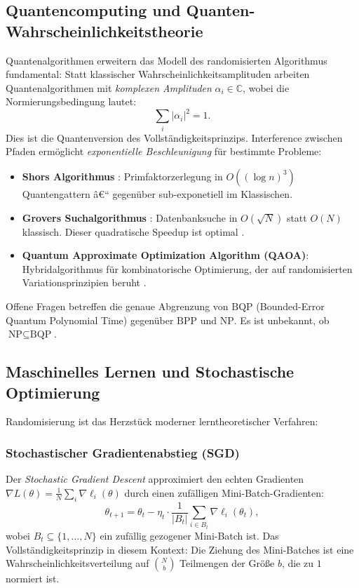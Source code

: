 ﻿\documentclass[12pt,a4paper]{article}
\theoremstyle{definition}
\theoremstyle{plain}
\theoremstyle{remark}
\begin{document}
\subsection{Quantencomputing und Quanten-Wahr\-schein\-lich\-keits\-theo\-rie}

Quantenalgorithmen erweitern das Modell des randomisierten Algorithmus
fundamental: Statt klassischer Wahrscheinlichkeitsamplituden arbeiten
Quantenalgorithmen mit \emph{komplexen Amplituden} $\alpha_i \in \mathbb{C}$,
wobei die Normierungsbedingung lautet:
\[
  \sum_i |\alpha_i|^2 = 1.
\]
Dies ist die Quantenversion des Vollständigkeitsprinzips. Interference zwischen
Pfaden ermöglicht \emph{exponentielle Beschleunigung} für bestimmte Probleme:
\begin{itemize}
  \item \textbf{Shors Algorithmus} \cite{shor1994algorithms}: Primfaktorzerlegung
    in $O((\log n)^3)$ Quantengattern â€“ gegenüber sub-exponetiell im Klassischen.
  \item \textbf{Grovers Suchalgorithmus} \cite{grover1996fast}: Datenbanksuche
    in $O(\sqrt{N})$ statt $O(N)$ klassisch. Dieser quadratische Speedup ist
    optimal \cite{bennett1997strengths}.
  \item \textbf{Quantum Approximate Optimization Algorithm (QAOA)}:
    Hybridalgorithmus für kombinatorische Optimierung, der auf randomisierten
    Variationsprinzipien beruht \cite{farhi2014quantum}.
\end{itemize}
Offene Fragen betreffen die genaue Abgrenzung von $\text{BQP}$
(Bounded-Error Quantum Polynomial Time) gegenüber $\text{BPP}$ und $\text{NP}$.
Es ist unbekannt, ob $\text{NP} \subseteq \text{BQP}$.

\subsection{Maschinelles Lernen und Stochastische Optimierung}

Randomisierung ist das Herzstück moderner lerntheoretischer Verfahren:

\subsubsection{Stochastischer Gradientenabstieg (SGD)}
Der \emph{Stochastic Gradient Descent} \cite{robbins1951stochastic} approximiert
den echten Gradienten $\nabla L(\theta) = \frac{1}{N}\sum_i \nabla \ell_i(\theta)$
durch einen zufälligen Mini-Batch-Gradienten:
\[
  \theta_{t+1} = \theta_t - \eta_t \cdot \frac{1}{|B_t|} \sum_{i \in B_t}
  \nabla \ell_i(\theta_t),
\]
wobei $B_t \subseteq \{1,\ldots,N\}$ ein zufällig gezogener Mini-Batch ist.
Das Vollständigkeitsprinzip in diesem Kontext: Die Ziehung des Mini-Batches
ist eine Wahrscheinlichkeitsverteilung auf $\binom{N}{b}$ Teilmengen der
Größe $b$, die zu $1$ normiert ist.
\end{document}
